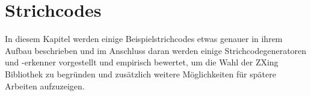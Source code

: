 \chapter{Strichcodes}
\writtenby{\dcauthornameriren}%
In diesem Kapitel werden einige Beispielstrichcodes etwas genauer in ihrem Aufbau beschrieben und im Anschluss daran werden einige Strichcodegeneratoren und -erkenner vorgestellt und empirisch bewertet, um die Wahl der ZXing Bibliothek zu begründen und zusätzlich weitere Möglichkeiten für spätere Arbeiten aufzuzeigen.



